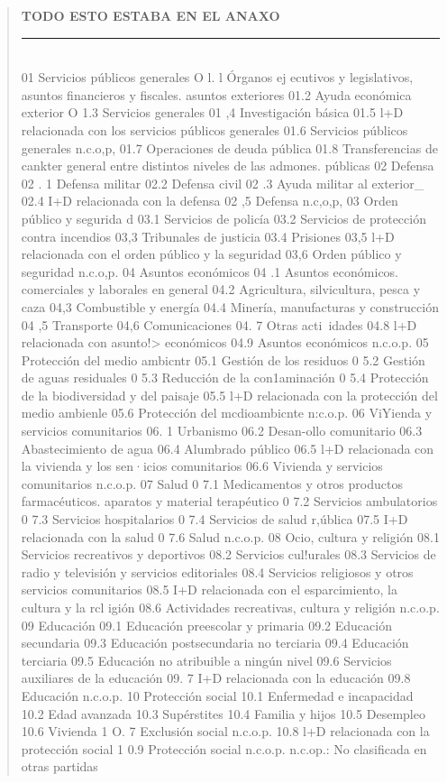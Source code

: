 \documentclass[10pt,a4paper]{article}
\newenvironment{specialblock}[1]{%
      \begin{quote} %
      \small %
      \noindent\textbf{#1}\\[-0.3em] %
      \rule{\linewidth}{0.4pt}\\[0.6em]}{
      \end{quote}}
\begin{document}
\begin{specialblock}{\textbf{TODO ESTO ESTABA EN EL ANAXO}}
    01 Servicios públicos generales
    O l. l Órganos ej ecutivos y legislativos, asuntos financieros y fiscales. asuntos exteriores
    01.2 Ayuda económica exterior
    O 1.3 Servicios generales
    01 ,4 Investigación básica
    01.5 l+D relacionada con los servicios públicos generales   
    01.6 Servicios públicos generales n.c.o,p,
    01.7 Operaciones de deuda pública
    01.8 Transferencias de cankter general entre distintos niveles de las admones. públicas
    02 Defensa
    02 . 1 Defensa militar
    02.2 Defensa civil
    02 .3 Ayuda militar al exterior_
    02.4 I+D relacionada con la defensa
    02 ,5 Defensa n.c,o,p,
    03 Orden público y segurida d
    03.1 Servicios de policía
    03.2 Servicios de protección contra incendios
    03,3 Tribunales de justicia
    03.4 Prisiones
    03,5 l+D relacionada con el orden público y la seguridad
    03,6 Orden público y seguridad n.c.o,p.
    04 Asuntos económicos
    04 .1 Asuntos económicos. comerciales y laborales en general
    04.2 Agricultura, silvicultura, pesca y caza
    04,3 Combustible y energía
    04.4 Minería, manufacturas y construcción
    04 ,5 Transporte
    04,6 Comunicaciones
    04. 7 Otras acti\ idades
    04.8 l+D relacionada con asunto!> económicos
    04.9 Asuntos económicos n.c.o.p.
    05 Protección del medio ambicntr
    05.1 Gestión de los residuos
    0 5.2 Gestión de aguas residuales
    0 5.3 Reducción de la con1aminación
    0 5.4 Protección de la biodiversidad y del paisaje
    05.5 l+D relacionada con la protección del medio ambienle
    05.6 Protección del mcdioambicnte n:c.o.p.
    06 ViYienda y servicios comunitarios
    06. 1 Urbanismo
    06.2 Desan-ollo comunitario
    06.3 Abastecimiento de agua
    06.4 Alumbrado público
    06.5 l+D relacionada con la vivienda y los sen·icios comunitarios
    06.6 Vivienda y servicios comunitarios n.c.o.p.
    07 Salud
    0 7.1 Medicamentos y otros productos farmacéuticos. aparatos y material terapéutico
    0 7.2 Servicios ambulatorios
    0 7.3 Servicios hospitalarios
    0 7.4 Servicios de salud r,ública
    07.5 I+D relacionada con la salud
    0 7.6 Salud n.c.o.p.
    08 Ocio, cultura y religión
    08.1 Servicios recreativos y deportivos
    08.2 Servicios cul!urales
    08.3 Servicios de radio y televisión y servicios editoriales
    08.4 Servicios religiosos y otros servicios comunitarios
    08.5 I+D relacionada con el esparcimiento, la cultura y la rcl igión
    08.6 Actividades recreativas, cultura y religión n.c.o.p.
    09 Educación
    09.1 Educación preescolar y primaria
    09.2 Educación secundaria
    09.3 Educación postsecundaria no terciaria
    09.4 Educación terciaria
    09.5 Educación no atribuible a ningún nivel
    09.6 Servicios auxiliares de la educación
    09. 7 I+D relacionada con la educación
    09.8 Educación n.c.o.p.
    10 Protección social
    10.1 Enfermedad e incapacidad
    10.2 Edad avanzada
    10.3 Supérstites
    10.4 Familia y hijos
    10.5 Desempleo
    10.6 Vivienda
    1 O. 7 Exclusión social n.c.o.p.
    10.8 l+D relacionada con la protección social
    1 0.9 Protección social n.c.o.p.
    n.c.op.: No clasificada en otras partidas
\end{specialblock}
\end{document}
